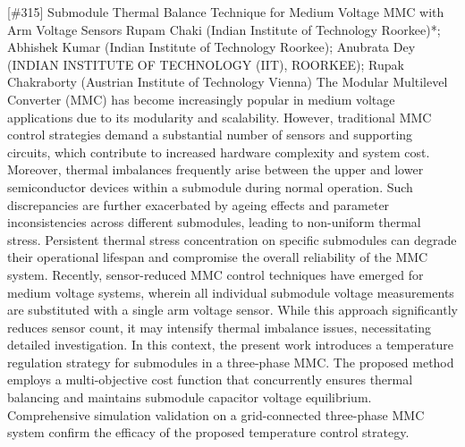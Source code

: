 {} \begin{abstract_online} {[\#315] Submodule Thermal Balance Technique for Medium Voltage MMC with Arm Voltage Sensors} {} {Rupam Chaki (Indian Institute of Technology Roorkee)*; Abhishek  Kumar (Indian Institute of Technology Roorkee); Anubrata Dey (INDIAN INSTITUTE OF TECHNOLOGY (IIT),  ROORKEE); Rupak  Chakraborty (Austrian Institute of Technology Vienna)} {} The Modular Multilevel Converter (MMC) has become increasingly popular in medium voltage applications due to its modularity and scalability. However, traditional MMC control strategies demand a substantial number of sensors and supporting circuits, which contribute to increased hardware complexity and system cost. Moreover, thermal imbalances frequently arise between the upper and lower semiconductor devices within a submodule during normal operation. Such discrepancies are further exacerbated by ageing effects and parameter inconsistencies across different submodules, leading to non-uniform thermal stress. Persistent thermal stress concentration on specific submodules can degrade their operational lifespan and compromise the overall reliability of the MMC system. Recently, sensor-reduced MMC control techniques have emerged for medium voltage systems, wherein all individual submodule voltage measurements are substituted with a single arm voltage sensor. While this approach significantly reduces sensor count, it may intensify thermal imbalance issues, necessitating detailed investigation. In this context, the present work introduces a temperature regulation strategy for submodules in a three-phase MMC. The proposed method employs a multi-objective cost function that concurrently ensures thermal balancing and maintains submodule capacitor voltage equilibrium. Comprehensive simulation validation on a grid-connected three-phase MMC system confirm the efficacy of the proposed temperature control strategy. \end{abstract_online} 
